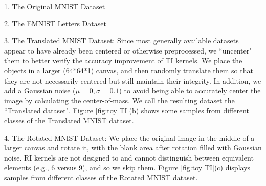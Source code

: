 \documentclass{article}
\theoremstyle{plain}
\theoremstyle{definition}
\theoremstyle{remark}
\begin{document}
\begin{compactitem}[\hspace{0.5cm}]
    \item[1.] The Original MNIST Dataset \cite{lecun-mnisthandwrittendigit-2010}
    
    \item[2.] The EMNIST Letters Dataset \cite{cohen2017emnist}
    
    \item[3.] The Translated MNIST Dataset: 
    Since most generally available datasets appear to have already been centered or otherwise preprocessed, we ``uncenter" them to better verify the accuracy improvement of TI kernels.  We place the objects in a larger (64*64*1) canvas, and then randomly translate them so that they are not necessarily centered but still maintain their integrity. In addition, we add a Gaussian noise ($\mu = 0, \sigma=0.1$) to avoid being able to accurately center the image by calculating the center-of-mass. We call the resulting dataset the ``Translated dataset". Figure \ref{fig:toy TI}(b) shows some samples from different classes of the Translated MNIST dataset.
    
    \item[4.] The Rotated MNIST Dataset:
    We place the original image in the middle of a larger canvas and rotate it, with the blank area after rotation filled with Gaussian noise. RI kernels are not designed to and cannot distinguish between equivalent elements (e.g., 6 versus 9), and so we skip them. Figure \ref{fig:toy TI}(c) displays  samples from different classes of the Rotated MNIST dataset.
\end{compactitem}
\end{document}
